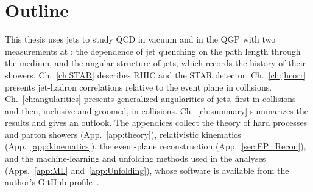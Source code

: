 \section{Outline}
This thesis uses jets to study QCD in vacuum and in the QGP with two measurements at : the dependence of jet quenching on the path length through the medium, and the angular structure of jets, which records the history of their showers.
%
Ch.~\ref{ch:STAR} describes RHIC and the STAR detector.
%
Ch.~\ref{ch:jhcorr} presents jet-hadron correlations relative to the event plane in \AuAu collisions.
%
Ch.~\ref{ch:angularities} presents generalized angularities of jets, first in \AuAu collisions and then, inclusive and groomed, in \pp collisions.
%
Ch.~\ref{ch:summary} summarizes the results and gives an outlook.
%
The appendices collect the theory of hard processes and parton showers (App.~\ref{app:theory}), relativistic kinematics (App.~\ref{app:kinematics}), the event-plane reconstruction (App.~\ref{sec:EP_Recon}), and the machine-learning and unfolding methods used in the analyses (Apps.~\ref{app:ML} and~\ref{app:Unfolding}), whose software is available from the author's GitHub profile~\cite{PaniGitHub}.









